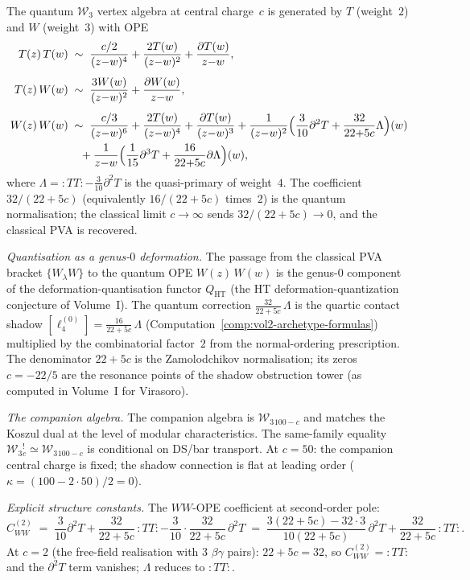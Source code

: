 \begin{computation}
\label{comp:w3-pva-quantisation}
The quantum $\mathcal W_3$ vertex algebra at central charge~$c$
is generated by $T$ (weight~$2$) and $W$ (weight~$3$) with OPE
\begin{align*}
T(z)\,T(w)
&\;\sim\;
\frac{c/2}{(z{-}w)^4}
+\frac{2T(w)}{(z{-}w)^2}
+\frac{\partial T(w)}{z{-}w},\\[4pt]
T(z)\,W(w)
&\;\sim\;
\frac{3W(w)}{(z{-}w)^2}
+\frac{\partial W(w)}{z{-}w},\\[4pt]
W(z)\,W(w)
&\;\sim\;
\frac{c/3}{(z{-}w)^6}
+\frac{2T(w)}{(z{-}w)^4}
+\frac{\partial T(w)}{(z{-}w)^3}
+\frac{1}{(z{-}w)^2}
\Bigl(
\frac{3}{10}\partial^2 T
+\frac{32}{22{+}5c}\Lambda
\Bigr)(w)\\
&\quad
+\frac{1}{z{-}w}
\Bigl(
\frac{1}{15}\partial^3 T
+\frac{16}{22{+}5c}\partial\Lambda
\Bigr)(w),
\end{align*}
where $\Lambda={:}TT{:}-\frac{3}{10}\partial^2 T$ is the
quasi-primary of weight~$4$. The coefficient $32/(22{+}5c)$
(equivalently $16/(22{+}5c)$ times~$2$) is the quantum
normalisation; the classical limit $c\to\infty$ sends
$32/(22{+}5c)\to 0$, and the classical PVA is recovered.

\emph{Quantisation as a genus-$0$ deformation.}
The passage from the classical PVA bracket
$\{W_\lambda W\}$ to the quantum OPE $W(z)\,W(w)$ is the
genus-$0$ component of the deformation-quantisation functor
$Q_{\mathrm{HT}}$
\textup{(}the HT deformation-quantization conjecture of Volume~I\textup{)}.
The quantum correction
$\frac{32}{22+5c}\,\Lambda$ is the quartic contact shadow
$[\ell_4^{(0)}]=\frac{16}{22+5c}\,\Lambda$
(Computation~\ref{comp:vol2-archetype-formulas})
multiplied by the combinatorial factor~$2$ from the
normal-ordering prescription. The denominator $22+5c$ is
the Zamolodchikov normalisation; its zeros
$c=-22/5$ are the resonance points of the shadow obstruction tower
\textup{(}as computed in Volume~I for Virasoro\textup{)}.

\emph{The companion algebra.}
The companion algebra is $\mathcal W_3{}_{100-c}$ and matches
the Koszul dual at the level of modular characteristics. The
same-family equality
$\mathcal W_3{}_c^!\simeq\mathcal W_3{}_{100-c}$ is conditional on
DS/bar transport.
At $c=50$: the companion central charge is fixed;
the shadow connection is flat at leading order
($\kappa=(100-2\cdot 50)/2=0$).

\emph{Explicit structure constants.}
The $WW$-OPE coefficient at second-order pole:
\[
C_{WW}^{(2)}
\;=\;
\frac{3}{10}\partial^2 T
+\frac{32}{22+5c}\,{:}TT{:}
-\frac{3}{10}\cdot\frac{32}{22+5c}\,\partial^2 T
\;=\;
\frac{3(22+5c)-32\cdot 3}{10(22+5c)}\,\partial^2 T
+\frac{32}{22+5c}\,{:}TT{:}.
\]
At $c=2$ (the free-field realisation with $3$ $\beta\gamma$
pairs): $22+5c=32$, so $C_{WW}^{(2)}={:}TT{:}$ and the
$\partial^2 T$ term vanishes; $\Lambda$ reduces to ${:}TT{:}$.
\end{computation}

